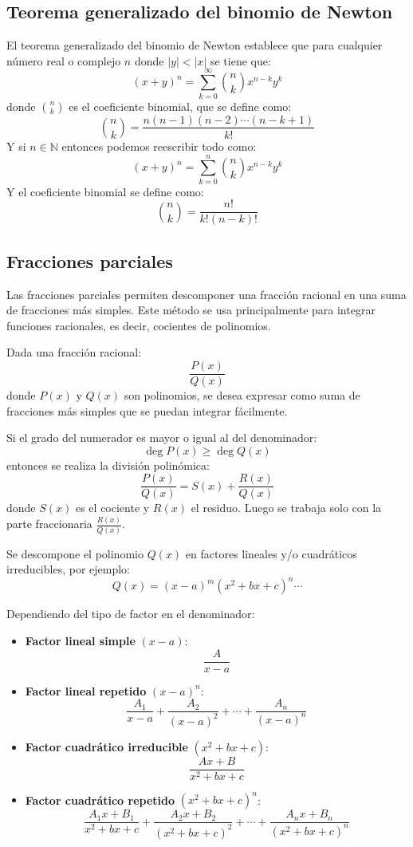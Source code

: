 \subsection{Teorema generalizado del binomio de Newton}
El teorema generalizado del binomio de Newton establece que para cualquier número real o complejo \(n\) donde \(|y| < |x|\) se tiene que:
\[    
{(x + y)}^n = \sum_{k = 0}^{\infty} \binom{n}{k} x^{n - k} y^k 
\]
donde \(\binom{n}{k}\) es el coeficiente binomial, que se define como:
\[
    \binom{n}{k} = \frac{n(n - 1)(n - 2) \cdots (n - k + 1)}{k!}
\]
Y si \(n\in\mathbb{N}\) entonces podemos reescribir todo como:
\[    
{(x + y)}^n = \sum_{k = 0}^{n} \binom{n}{k} x^{n - k} y^k 
\]
Y el coeficiente binomial se define como:
\[
    \binom{n}{k} = \frac{n!}{k!(n - k)!}
\]

\subsection{Fracciones parciales}
Las fracciones parciales permiten descomponer una fracción racional en una suma de fracciones más simples.  
Este método se usa principalmente para integrar funciones racionales, es decir, cocientes de polinomios.

Dada una fracción racional:
\[
\frac{P(x)}{Q(x)}
\]
donde \(P(x)\) y \(Q(x)\) son polinomios, se desea expresar como suma de fracciones más simples que se puedan integrar fácilmente.

Si el grado del numerador es mayor o igual al del denominador:
\[
\deg P(x) \geq \deg Q(x)
\]
entonces se realiza la división polinómica:
\[
\frac{P(x)}{Q(x)} = S(x) + \frac{R(x)}{Q(x)}
\]
donde \(S(x)\) es el cociente y \(R(x)\) el residuo.  
Luego se trabaja solo con la parte fraccionaria \(\frac{R(x)}{Q(x)}\).

Se descompone el polinomio \(Q(x)\) en factores lineales y/o cuadráticos irreducibles, por ejemplo:
\[
Q(x) = {(x - a)}^m {(x^2 + bx + c)}^n \cdots
\]

Dependiendo del tipo de factor en el denominador:

\begin{itemize}
    \item \textbf{Factor lineal simple} \((x - a)\): 
    \[
    \frac{A}{x - a}
    \]
    
    \item \textbf{Factor lineal repetido} \({(x - a)}^n\): 
    \[
    \frac{A_1}{x - a} + \frac{A_2}{{(x - a)}^2} + \cdots + \frac{A_n}{{(x - a)}^n}
    \]

    \item \textbf{Factor cuadrático irreducible} \((x^2 + bx + c)\): 
    \[
    \frac{Ax + B}{x^2 + bx + c}
    \]

    \item \textbf{Factor cuadrático repetido} \({(x^2 + bx + c)}^n\): 
    \[
    \frac{A_1x + B_1}{x^2 + bx + c} + \frac{A_2x + B_2}{{(x^2 + bx + c)}^2} + \cdots + \frac{A_n x + B_n}{{(x^2 + bx + c)}^n}
    \]
\end{itemize}

